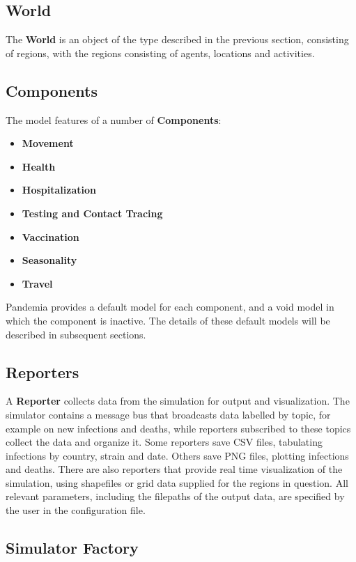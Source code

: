 \documentclass[10pt,letterpaper]{article}
\begin{document}
\subsection{World}

The \textbf{World} is an object of the type described in the previous section, consisting of regions, with the regions consisting of agents, locations and activities.

\subsection{Components}

The model features of a number of \textbf{Components}:
\begin{itemize}
\item \textbf{Movement}
\item \textbf{Health}
\item \textbf{Hospitalization}
\item \textbf{Testing and Contact Tracing}
\item \textbf{Vaccination}
\item \textbf{Seasonality}
\item \textbf{Travel}
\end{itemize}
Pandemia provides a default model for each component, and a void model in which the component is inactive. The details of these default models will be described in subsequent sections.

\subsection{Reporters}

A \textbf{Reporter} collects data from the simulation for output and visualization. The simulator contains a message bus that broadcasts data labelled by topic, for example on new infections and deaths, while reporters subscribed to these topics collect the data and organize it. Some reporters save CSV files, tabulating infections by country, strain and date. Others save PNG files, plotting infections and deaths. There are also reporters that provide real time visualization of the simulation, using shapefiles or grid data supplied for the regions in question. All relevant parameters, including the filepaths of the output data, are specified by the user in the configuration file.

\subsection{Simulator Factory}
\end{document}
